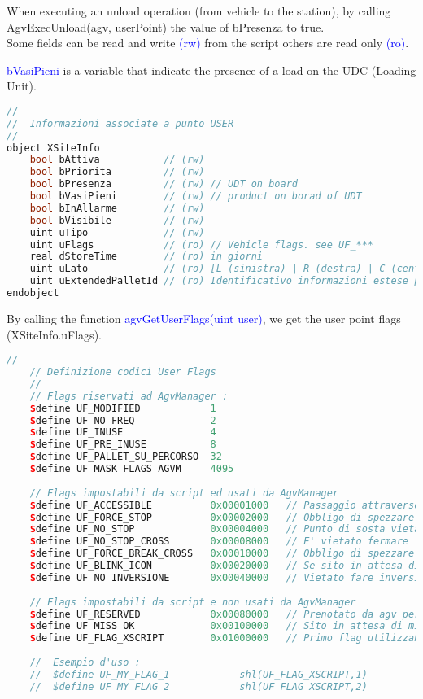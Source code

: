 When executing an unload operation (from vehicle to the station), by calling {AgvExecUnload(agv, userPoint)} the value of {bPresenza} to true.\\

Some fields can be read and write \textcolor{blue}{(rw)} from the script others are read only \textcolor{blue}{(ro)}.

\textcolor{blue}{bVasiPieni} is a variable that indicate the presence of a load on the UDC (Loading Unit).

\begin{lstlisting}[language=c++, caption= XSiteInfo, label=lstXSiteInfo]
//
//	Informazioni associate a punto USER
//
object XSiteInfo
	bool bAttiva           // (rw)
	bool bPriorita         // (rw)
	bool bPresenza         // (rw) // UDT on board
	bool bVasiPieni        // (rw) // product on borad of UDT
	bool bInAllarme        // (rw)
	bool bVisibile         // (rw)
	uint uTipo             // (rw)
	uint uFlags            // (ro) // Vehicle flags. see UF_***
	real dStoreTime        // (ro) in giorni
	uint uLato             // (ro) [L (sinistra) | R (destra) | C (centro)]
	uint uExtendedPalletId // (ro) Identificativo informazioni estese pallet (se presenti)	
endobject
\end{lstlisting}

By calling the function \textcolor{blue}{agvGetUserFlags(uint user)}, we get the user point flags (XSiteInfo.uFlags).
\begin{lstlisting}[language=c++,caption= User point flags, label= lstUserFlags]
	//
	// Definizione codici User Flags
	//
	// Flags riservati ad AgvManager :
	$define UF_MODIFIED            1
	$define UF_NO_FREQ             2
	$define UF_INUSE               4
	$define UF_PRE_INUSE           8
	$define UF_PALLET_SU_PERCORSO  32
	$define UF_MASK_FLAGS_AGVM     4095
	
	// Flags impostabili da script ed usati da AgvManager
	$define UF_ACCESSIBLE          0x00001000	// Passaggio attraverso user possibile (default vero)
	$define UF_FORCE_STOP          0x00002000	// Obbligo di spezzare movimento
	$define UF_NO_STOP             0x00004000	// Punto di sosta vietata
	$define UF_NO_STOP_CROSS       0x00008000	// E' vietato fermare l'agv su questo incrocio
	$define UF_FORCE_BREAK_CROSS   0x00010000	// Obbligo di spezzare movimento su incrocio
	$define UF_BLINK_ICON          0x00020000	// Se sito in attesa di missione o riservato, icona blinka
	$define UF_NO_INVERSIONE       0x00040000	// Vietato fare inversione su questo punto
	
	// Flags impostabili da script e non usati da AgvManager
	$define UF_RESERVED            0x00080000	// Prenotato da agv per missione (viene disegnato bollo rosso)
	$define UF_MISS_OK             0x00100000	// Sito in attesa di missione (viene disegnato bollo verde)
	$define UF_FLAG_XSCRIPT        0x01000000	// Primo flag utilizzabile liberamente da script
	
	//  Esempio d'uso :
	//  $define UF_MY_FLAG_1			shl(UF_FLAG_XSCRIPT,1)
	//  $define UF_MY_FLAG_2			shl(UF_FLAG_XSCRIPT,2)
\end{lstlisting}


